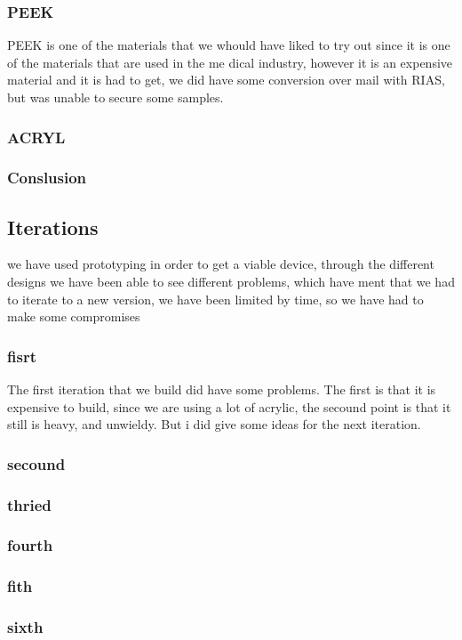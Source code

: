 \subsubsection{PEEK}
PEEK is one of the materials that we whould have liked to try out since it is one of the materials that are used in the me dical industry, however it is an expensive material and it is had to get, we did have some conversion over mail with RIAS, but was unable to secure some samples.

\subsubsection{ACRYL}

\subsubsection{Conslusion}

\subsection{Iterations}
we have used prototyping in order to get a viable device, through the different designs we have been able to see different problems, which have ment that we had to iterate to a new version, we have been limited by time, so we have had to make some compromises

\subsubsection{fisrt}
The first iteration that we build did have some problems.
The first is that it is expensive to build, since we are using a lot of acrylic, the secound point is that it still is heavy, and unwieldy.
But i did give some ideas for the next iteration.

\subsubsection{secound}


\subsubsection{thried}


\subsubsection{fourth}


\subsubsection{fith}

\subsubsection{sixth}

